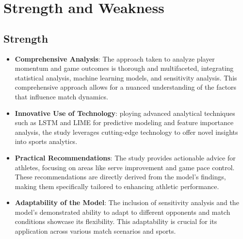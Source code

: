 \documentclass{mcmthesis}
\begin{document}






\section{Strength and Weakness}

\subsection{Strength}

\begin{itemize}
    \item[] {\bf Comprehensive Analysis}: The approach taken to analyze player momentum and game outcomes is thorough and multifaceted, integrating statistical analysis, machine learning models, and sensitivity analysis. This comprehensive approach allows for a nuanced understanding of the factors that influence match dynamics.

    \item[] {\bf Innovative Use of Technology}: ploying advanced analytical techniques such as LSTM and LIME for predictive modeling and feature importance analysis, the study leverages cutting-edge technology to offer novel insights into sports analytics.

    \item[] {\bf Practical Recommendations}: The study provides actionable advice for athletes, focusing on areas like serve improvement and game pace control. These recommendations are directly derived from the model's findings, making them specifically tailored to enhancing athletic performance.

    \item[] {\bf Adaptability of the Model}: The inclusion of sensitivity analysis and the model's demonstrated ability to adapt to different opponents and match conditions showcase its flexibility. This adaptability is crucial for its application across various match scenarios and sports.

\end{itemize}
\end{document}
